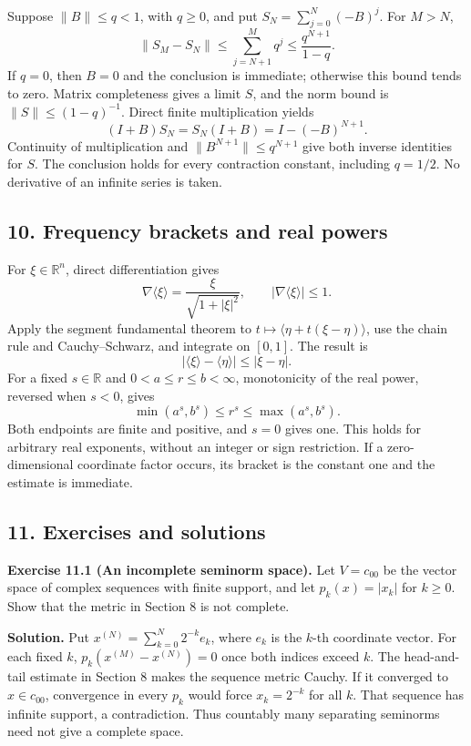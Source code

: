 \documentclass[
  11pt,
]{article}
\begin{document}
Suppose \(\|B\|\leq q<1\), with \(q\geq0\), and put
\(S_N=\sum_{j=0}^N(-B)^j\). For \(M>N\), \[
\|S_M-S_N\|\leq\sum_{j=N+1}^M q^j\leq\frac{q^{N+1}}{1-q}.
\] If \(q=0\), then \(B=0\) and the conclusion is immediate; otherwise
this bound tends to zero. Matrix completeness gives a limit \(S\), and
the norm bound is \(\|S\|\leq(1-q)^{-1}\). Direct finite multiplication
yields \[
(I+B)S_N=S_N(I+B)=I-(-B)^{N+1}.
\] Continuity of multiplication and \(\|B^{N+1}\|\leq q^{N+1}\) give
both inverse identities for \(S\). The conclusion holds for every
contraction constant, including \(q=1/2\). No derivative of an infinite
series is taken.

\subsection{10. Frequency brackets and real
powers}\label{frequency-brackets-and-real-powers}

For \(\xi\in\mathbb R^n\), direct differentiation gives \[
\nabla\langle\xi\rangle=\frac{\xi}{\sqrt{1+|\xi|^2}},\qquad
|\nabla\langle\xi\rangle|\leq1.
\] Apply the segment fundamental theorem to
\(t\mapsto\langle\eta+t(\xi-\eta)\rangle\), use the chain rule and
Cauchy--Schwarz, and integrate on \([0,1]\). The result is \[
|\langle\xi\rangle-\langle\eta\rangle|\leq|\xi-\eta|.
\] For a fixed \(s\in\mathbb R\) and \(0<a\leq r\leq b<\infty\),
monotonicity of the real power, reversed when \(s<0\), gives \[
\min(a^s,b^s)\leq r^s\leq\max(a^s,b^s).
\] Both endpoints are finite and positive, and \(s=0\) gives one. This
holds for arbitrary real exponents, without an integer or sign
restriction. If a zero-dimensional coordinate factor occurs, its bracket
is the constant one and the estimate is immediate.

\subsection{11. Exercises and solutions}\label{exercises-and-solutions}

\textbf{Exercise 11.1 (An incomplete seminorm space).} Let \(V=c_{00}\)
be the vector space of complex sequences with finite support, and let
\(p_k(x)=|x_k|\) for \(k\geq0\). Show that the metric in Section 8 is
not complete.

\textbf{Solution.} Put \(x^{(N)}=\sum_{k=0}^{N}2^{-k}e_k\), where
\(e_k\) is the \(k\)-th coordinate vector. For each fixed \(k\),
\(p_k(x^{(M)}-x^{(N)})=0\) once both indices exceed \(k\). The
head-and-tail estimate in Section 8 makes the sequence metric Cauchy. If
it converged to \(x\in c_{00}\), convergence in every \(p_k\) would
force \(x_k=2^{-k}\) for all \(k\). That sequence has infinite support,
a contradiction. Thus countably many separating seminorms need not give
a complete space.
\end{document}
